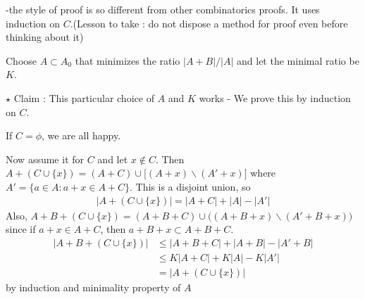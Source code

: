 \documentclass[10pt,a4paper]{report}
\newenvironment{proof}
{\begin{changemargin}{1cm}{0.5cm}
	}%
	{\end{changemargin}
}
\newenvironment{subproof}
{\begin{changemargin}{0.5cm}{0.5cm}
	}%
	{\end{changemargin}
}
\begin{document}
-the style of proof is so different from other combinatorics proofs. It uses induction on $C$.(Lesson to take : do not dispose a method for proof even before thinking about it)
\begin{proof}
\pf Choose $A \subset A_0$ that minimizes the ratio $|A+B|/|A|$ and let the minimal ratio be $K$.

\begin{subproof}
$\star$ Claim : This particular choice of $A$ and $K$ works - We prove this by induction on $C$.

\pf If $C=\phi$, we are all happy.

Now assume it for $C$ and let $x\notin C$. Then $A+(C \cup \{x\}) = (A+C) \cup \Big[ (A+x) \backslash (A'+x) \Big]$ where $A' = \{a\in A: a+x\in A+ C\}$. This is a disjoint union, so
\begin{align*}
|A+(C\cup \{x\})| = |A+C| + |A| - |A'|
\end{align*}
Also, $A+B + (C\cup \{x\}) = (A+B+C) \cup \big( (A+B+x) \backslash (A'+B+x)\big)$ since if $a+x\in A+C$, then $a+B+x \subset A+B+C$.
\begin{align*}
|A+B+(C\cup \{x \}) | &\leq |A+B+C| + |A+B| - |A'+B| \\
&\leq K|A+C| + K|A| - K|A'| \\
& = |A+(C\cup \{x\})|
\end{align*}
by induction and minimality property of $A$
\end{subproof}

\eop
\end{proof}
\end{document}
